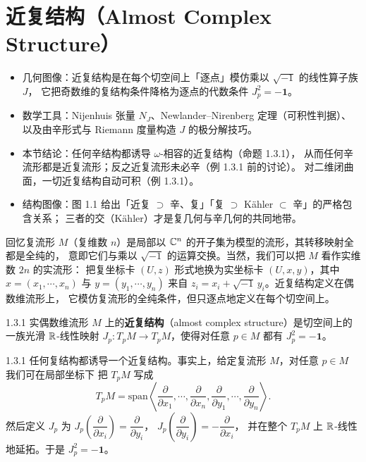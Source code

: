 \section{近复结构（Almost Complex Structure）}

\begin{keytakeaways}
\begin{itemize}
  \item 几何图像：近复结构是在每个切空间上「逐点」模仿乘以 $\sqrt{-1}$ 的线性算子族 $J$，
        它把奇数维的复结构条件降格为逐点的代数条件 $J_p^2=-\mathbf{1}$。
  \item 数学工具：Nijenhuis 张量 $N_J$、Newlander--Nirenberg 定理（可积性判据）、
        以及由辛形式与 Riemann 度量构造 $J$ 的极分解技巧。
  \item 本节结论：任何辛结构都诱导 $\omega$-相容的近复结构（命题 1.3.1），
        从而任何辛流形都是近复流形；反之近复流形未必辛（例 1.3.1 前的讨论）。
        对二维闭曲面，一切近复结构自动可积（例 1.3.1）。
  \item 结构图像：图 1.1 给出「近复 $\supset$ 辛、复」「复 $\supset$ Kähler $\subset$ 辛」的严格包含关系；
        三者的交（Kähler）才是复几何与辛几何的共同地带。
\end{itemize}
\end{keytakeaways}

回忆复流形 $M$（复维数 $n$）是局部以 $\mathbb{C}^n$ 的开子集为模型的流形，其转移映射全都是全纯的，
意即它们与乘以 $\sqrt{-1}$ 的运算交换。当然，我们可以把 $M$ 看作实维数 $2n$ 的实流形：
把复坐标卡 $(U,z)$ 形式地换为实坐标卡 $(U,x,y)$，其中 $x=(x_1,\cdots,x_n)$ 与
$y=(y_1,\cdots,y_n)$ 来自 $z_i=x_i+\sqrt{-1}\,y_i$。近复结构定义在偶数维流形上，
它模仿复流形的全纯条件，但只逐点地定义在每个切空间上。

\begin{wdefn}{1.3.1}
实偶数维流形 $M$ 上的\textbf{近复结构}（almost complex structure）是切空间上的一族光滑
$\mathbb{R}$-线性映射 $J_p:T_pM\to T_pM$，使得对任意 $p\in M$ 都有 $J_p^2=-\mathbf{1}$。
\end{wdefn}

\begin{wrem}{1.3.1}
任何复结构都诱导一个近复结构。事实上，给定复流形 $M$，对任意 $p\in M$ 我们可在局部坐标下
把 $T_pM$ 写成
\[
  T_pM=\mathrm{span}\left\langle
  \frac{\partial}{\partial x_1},\cdots,\frac{\partial}{\partial x_n},
  \frac{\partial}{\partial y_1},\cdots,\frac{\partial}{\partial y_n}\right\rangle .
\]
然后定义 $J_p$ 为
$J_p\left(\dfrac{\partial}{\partial x_i}\right)=\dfrac{\partial}{\partial y_i}$，
$J_p\left(\dfrac{\partial}{\partial y_i}\right)=-\dfrac{\partial}{\partial x_i}$，
并在整个 $T_pM$ 上 $\mathbb{R}$-线性地延拓。于是 $J_p^2=-\mathbf{1}$。
\end{wrem}

